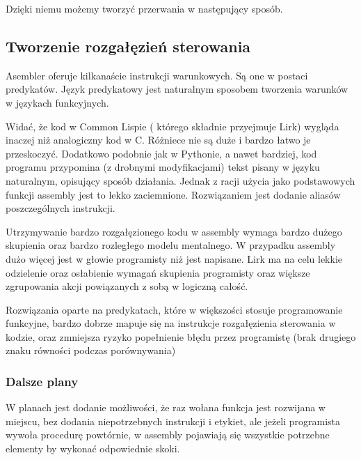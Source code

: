 \documentclass[11pt]{article}
\begin{document}
Dzięki niemu możemy tworzyć przerwania w następujący sposób.



\subsection{Tworzenie rozgałęzień sterowania}
Asembler oferuje kilkanaście instrukcji warunkowych. Są one w postaci predykatów. Język predykatowy jest naturalnym sposobem tworzenia warunków w językach funkcyjnych. 

\begin{multicols}{3}

\columnbreak

\columnbreak

\end{multicols}

Widać, że kod w Common Lispie ( którego składnie przyejmuje Lirk) wygląda inaczej niż analogiczny kod w C.
Różniece nie są duże i bardzo łatwo je przeskoczyć. Dodatkowo podobnie jak w Pythonie,
a nawet bardziej, kod programu przypomina (z drobnymi modyfikacjami) tekst pisany w języku naturalnym, opisujący sposób działania.
Jednak z racji użycia jako podstawowych funkcji assembly jest to lekko zaciemnione.
Rozwiązaniem jest dodanie aliasów poszczególnych instrukcji. 

Utrzymywanie bardzo rozgałęzionego kodu w assembly
wymaga bardzo dużego skupienia oraz bardzo rozległego modelu mentalnego.
W przypadku assembly dużo więcej jest w głowie programisty niż jest napisane.
Lirk ma na celu lekkie odzielenie oraz osłabienie wymagań skupienia programisty oraz większe zgrupowania akcji powiązanych z sobą w logiczną całość.

Rozwiązania oparte na predykatach, które w większości stosuje programowanie funkcyjne, bardzo dobrze mapuje się na instrukcje rozgałęzienia sterowania w kodzie,
oraz zmniejsza ryzyko popełnienie błędu przez programistę (brak drugiego znaku równości podczas porównywania)

\subsubsection{Dalsze plany}

W planach jest dodanie możliwości, że raz wołana funkcja jest rozwijana w miejscu, bez dodania niepotrzebnych instrukcji i etykiet, ale jeżeli programista wywoła procedurę powtórnie, w assembly pojawiają się wszystkie potrzebne elementy by wykonać odpowiednie skoki.
\end{document}

